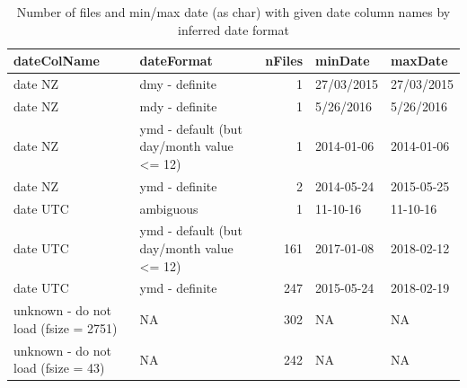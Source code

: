 \documentclass[]{article}
\newenvironment{Shaded}{\begin{snugshade}}{\end{snugshade}}
\newcommand{\KeywordTok}[1]{\textcolor[rgb]{0.13,0.29,0.53}{\textbf{#1}}}
\newcommand{\DataTypeTok}[1]{\textcolor[rgb]{0.13,0.29,0.53}{#1}}
\newcommand{\DecValTok}[1]{\textcolor[rgb]{0.00,0.00,0.81}{#1}}
\newcommand{\StringTok}[1]{\textcolor[rgb]{0.31,0.60,0.02}{#1}}
\newcommand{\CommentTok}[1]{\textcolor[rgb]{0.56,0.35,0.01}{\textit{#1}}}
\newcommand{\OperatorTok}[1]{\textcolor[rgb]{0.81,0.36,0.00}{\textbf{#1}}}
\newcommand{\NormalTok}[1]{#1}
\begin{document}
\begin{Shaded}
\end{Shaded}

\begin{table}

\caption{\label{tab:initialDateFormatTable}Number of files and min/max date (as char) with given date column names by inferred date format}
\centering
\fontsize{8}{10}\selectfont
\begin{tabular}[t]{llrll}
\toprule
dateColName & dateFormat & nFiles & minDate & maxDate\\
\midrule
date NZ & dmy - definite & 1 & 27/03/2015 & 27/03/2015\\
date NZ & mdy - definite & 1 & 5/26/2016 & 5/26/2016\\
date NZ & ymd - default (but day/month value <= 12) & 1 & 2014-01-06 & 2014-01-06\\
date NZ & ymd - definite & 2 & 2014-05-24 & 2015-05-25\\
date UTC & ambiguous & 1 & 11-10-16 & 11-10-16\\
\addlinespace
date UTC & ymd - default (but day/month value <= 12) & 161 & 2017-01-08 & 2018-02-12\\
date UTC & ymd - definite & 247 & 2015-05-24 & 2018-02-19\\
unknown - do not load (fsize = 2751) & NA & 302 & NA & NA\\
unknown - do not load (fsize = 43) & NA & 242 & NA & NA\\
\bottomrule
\end{tabular}
\end{table}
\end{document}
